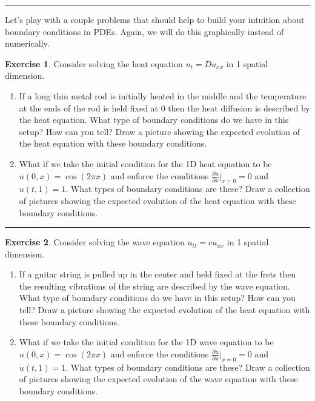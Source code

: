 \documentclass[
]{book}
\providecommand{\tightlist}{%
  \setlength{\itemsep}{0pt}\setlength{\parskip}{0pt}}
\theoremstyle{definition}
\theoremstyle{definition}
\theoremstyle{definition}
\newtheorem{exercise}{Exercise}[chapter]
\theoremstyle{remark}
\begin{document}
\begin{center}\rule{0.5\linewidth}{0.5pt}\end{center}

Let's play with a couple problems that should help to build your intuition about boundary conditions in PDEs. Again, we will do this graphically instead of numerically.

\begin{exercise}
\protect\hypertarget{exr:unnamed-chunk-541}{}{\label{exr:unnamed-chunk-541} }Consider solving the heat equation \(u_t = D u_{xx}\) in 1 spatial dimension.

\begin{enumerate}
\def\labelenumi{\alph{enumi}.}
\tightlist
\item
  If a long thin metal rod is initially heated in the middle and the temperature at the ends of the rod is held fixed at 0 then the heat diffusion is described by the heat equation. What type of boundary conditions do we have in this setup? How can you tell? Draw a picture showing the expected evolution of the heat equation with these boundary conditions.
\item
  What if we take the initial condition for the 1D heat equation to be \(u(0,x) = \cos(2\pi x)\) and enforce the conditions \(\frac{\partial u}{\partial x}\Big|_{x=0} = 0\) and \(u(t,1) = 1\). What types of boundary conditions are these? Draw a collection of pictures showing the expected evolution of the heat equation with these boundary conditions.
\end{enumerate}
\end{exercise}

\begin{center}\rule{0.5\linewidth}{0.5pt}\end{center}

\begin{exercise}
\protect\hypertarget{exr:unnamed-chunk-542}{}{\label{exr:unnamed-chunk-542} }Consider solving the wave equation \(u_{tt} = c u_{xx}\) in 1 spatial dimension.

\begin{enumerate}
\def\labelenumi{\alph{enumi}.}
\tightlist
\item
  If a guitar string is pulled up in the center and held fixed at the frets then the resulting vibrations of the string are described by the wave equation. What type of boundary conditions do we have in this setup? How can you tell? Draw a picture showing the expected evolution of the heat equation with these boundary conditions.
\item
  What if we take the initial condition for the 1D wave equation to be \(u(0,x) = \cos(2\pi x)\) and enforce the conditions \(\frac{\partial u}{\partial x}\Big|_{x=0} = 0\) and \(u(t,1) = 1\). What types of boundary conditions are these? Draw a collection of pictures showing the expected evolution of the wave equation with these boundary conditions.
\end{enumerate}
\end{exercise}
\end{document}
